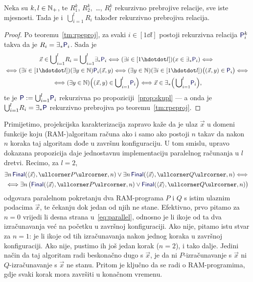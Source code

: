 \begin{propozicija}[{name=[rekurzivna prebrojivost unije rekurzivno prebrojivih relacija]}]\label{pp:unlre}
Neka su $k,l\in{\mathbb N}_+$, te $R_1^k$, $R_2^k$,~\ldots, $R_l^k$ rekurzivno prebrojive relacije, sve iste mjesnosti. Tada je i\, $\bigcup_{i=1}^l\! R_i$ također rekurzivno prebrojiva relacija.
\end{propozicija}
\begin{proof}
Po teoremu~\ref{tm:rpeproj}, za svaki $i\in[1\dd l]$ postoji rekurzivna relacija $\f P^k_i$ takva da je $R_i=\exists_*\f P_i$. Sada je
\begin{multline}\label{eq:urere}
    \vec x\in\bigcup\nolimits_{i=1}^l\! R_i=\bigcup\nolimits_{i=1}^l\!\exists_*\f P_i\Longleftrightarrow
    (\exists i\in[1\dd l])(x\in\exists_*\f P_i)\Longleftrightarrow{}\\
    {}\Longleftrightarrow(\exists i\in[1\dd l])(\exists y\in\N)\f P_i(\vec x,y)\Longleftrightarrow(\exists y\in\N)(\exists i\in[1\dd l])\bigl((\vec x,y)\in\f P_i\bigr)\Longleftrightarrow{}\\
    {}\Longleftrightarrow
    (\exists y\in\N)\Bigl((\vec x,y)\in\bigcup\nolimits_{i=1}^l\!\f P_i\Bigr)\Longleftrightarrow\vec x\in\exists_*\Bigl(\,\bigcup\nolimits_{i=1}^l\!\f P_i\Bigr)\text,
\end{multline}
te je $\f P:=\bigcup_{i=1}^l\!\f P_i$ rekurzivna po propoziciji~\ref{prop:skupl} --- a onda je $\bigcup_{i=1}^l\! R_i=\exists_*\f P$ rekurzivno prebrojiva po teoremu~\ref{tm:rpeproj}.
\end{proof}

Primijetimo, projekcijska karakterizacija zapravo kaže da je ulaz $\vec x$ u domeni funkcije koju (RAM-\!)algoritam računa ako i samo ako postoji $n$ takav da nakon $n$ koraka taj algoritam dođe u završnu konfiguraciju. U tom smislu, upravo dokazana propozicija daje jednostavnu implementaciju paralelnog računanja u $l$ dretvi. Recimo, za $l=2$,
\begin{multline}\label{eq:parallel}
    \exists n\,\f{Final}(\kr{\vec x},\kprog P,n)\lor\exists n\,\f{Final}(\kr{\vec x},\kprog Q,n)\Longleftrightarrow{}\\
    {}\Longleftrightarrow\exists n\,\bigl(\f{Final}(\kr{\vec x},\kprog P,n)\lor\f{Final}(\kr{\vec x},\kprog Q,n)\bigr)
\end{multline}
odgovara paralelnom pokretanju dva RAM-programa $P$ i $Q$ s istim ulaznim podacima $\vec x$, te čekanju dok jedan od njih ne stane. Efektivno, prvo pitamo za $n=0$ vrijedi li desna strana u~\eqref{eq:parallel}, odnosno je li ikoje od ta dva izračunavanja već na početku u završnoj konfiguraciji. Ako nije, pitamo istu stvar za $n=1$: je li ikoje od tih izračunavanja nakon jednog koraka u završnoj konfiguraciji. Ako nije, pustimo ih još jedan korak ($n=2$), i tako dalje. Jedini način da taj algoritam radi beskonačno dugo s $\vec x$, je da ni $P$-izračunavanje s $\vec x$ ni $Q$-izračunavanje s $\vec x$ ne stanu. Pritom je ključno da se radi o RAM-programima, gdje svaki korak mora završiti u konačnom vremenu.

